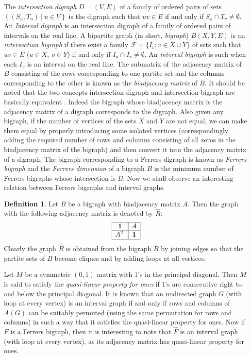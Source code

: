 \documentclass[11pt]{article}
\theoremstyle{definition}
\newtheorem{defn}[thm]{Definition}
\theoremstyle{remark}
\numberwithin{equation}{section}
\newcommand{\set}[1]{\left\{#1\right\}}
\newcommand{\Set}[2]{\set{#1\ \vert\ #2}}
\begin{document}
The {\em intersection digraph} $D=(V,E)$ of a family of ordered pairs of sets $\Set{(S_u,T_u)}{u\in V}$ is the digraph such that $uv\in E$ if and only if $S_u\cap T_v\neq\emptyset$. An {\em Interval digraph} is an intersection digraph of a family of ordered pairs of intervals on the real line. A bipartite graph (in short, {\em bigraph}) $B(X,Y,E)$ is an {\em intersection bigraph} if there exist a family $\mathcal{F} = \{ I_v : v \in X\cup Y\}$ of sets such that $uv\in E$ ($u\in X,\ v\in Y$) if and only if $I_u\cap I_v \neq \emptyset$. An {\em interval bigraph} is such when each $I_v$ is an interval on the real line. The submatrix of the adjacency matrix of $B$ consisting of the rows corresponding to one partite set and the columns corresponding to the other is known as the {\em biadjacency matrix} of $B$. It should be noted that the two concepts intersection digraph and  intersection bigraph are basically equivalent \cite{P}. Indeed the bigraph whose biadjacency matrix is the adjacency matrix of a digraph corresponds to the digraph. Also given any bigraph, if the number of vertices of the sets $X$ and $Y$ are not equal, we can make them equal by properly introducing some isolated vertices (correspondingly adding the required number of rows and columns consisting of all zeros in the biadjacency matrix of the bigraph) and then convert it into the adjacency matrix of a digraph. The bigraph corresponding to a Ferrers digraph is known as {\em Ferrers bigraph} and the {\em Ferrers dimension} of a bigraph $B$ is the minimum number of Ferrers bigraphs whose intersection is $B$. Now we shall observe an interesting relation between Ferrers bigraphs and interval graphs.

\begin{defn} 
Let $B$ be a bigraph with biadjacency matrix $A$. Then the graph with the following adjacency matrix is denoted by $\widehat{B}$:
$$\begin{array}{|c|c|}
\hline 
\mathbf{1} & A \\
\hline 
A^T & \mathbf{1} \\
\hline 
\end{array}$$
Clearly the graph $\widehat{B}$ is obtained from the bigraph $B$ by joining edges so that the partite sets of $B$ become cliques and by adding loops at all vertices.
\end{defn}

Let $M$ be a symmetric $(0,1)$ matrix with $1$'s in the principal diagonal. Then $M$ is said to satisfy the {\em quasi-linear property for ones} if $1$'s are consecutive right to and below the principal diagonal. It is known \cite{M} that an undirected graph $G$ (with loop at every vertex) is an interval graph if and only if rows and columns of $A(G)$ can be suitably permuted (using the same permutation for rows and columns) in such a way that it satisfies the quasi-linear property for ones. Now if $F$ is a Ferrers bigraph, then it is interesting to note that $\widehat{F}$ is an interval graph (with loop at every vertex), as its adjacency matrix has quasi-linear property for ones.
\end{document}
